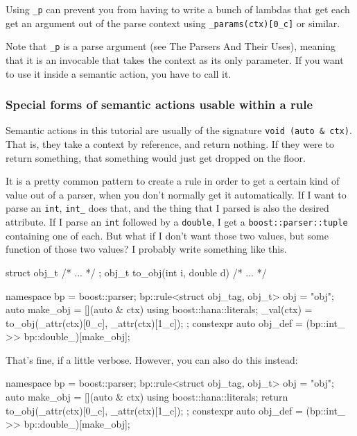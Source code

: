 Using \texttt{\_p} can prevent you from having to write a bunch of lambdas that get each get an argument out of the parse context using \texttt{\_params(ctx){[}0\_c{]}} or similar.

Note that \texttt{\_p} is a parse argument (see The Parsers And Their Uses), meaning that it is an invocable that takes the context as its only parameter. If you want to use it inside a semantic action, you have to call it.

\subsubsection{Special forms of semantic actions usable within a rule}

Semantic actions in this tutorial are usually of the signature \texttt{void (auto \& ctx)}. That is, they take a context by reference, and return nothing. If they were to return something, that something would just get dropped on the floor.

It is a pretty common pattern to create a rule in order to get a certain kind of value out of a parser, when you don't normally get it automatically. If I want to parse an \texttt{int}, \texttt{int\_} does that, and the thing that I parsed is also the desired attribute. If I parse an \texttt{int} followed by a \texttt{double}, I get a \texttt{boost::parser::tuple} containing one of each. But what if I don't want those two values, but some function of those two values? I probably write something like this.

\begin{code}
struct obj_t { /* ... */ };
obj_t to_obj(int i, double d) { /* ... */ }

namespace bp = boost::parser;
bp::rule<struct obj_tag, obj_t> obj = "obj";
auto make_obj = [](auto & ctx) {
    using boost::hana::literals;
    _val(ctx) = to_obj(_attr(ctx)[0_c], _attr(ctx)[1_c]);
};
constexpr auto obj_def = (bp::int_ >> bp::double_)[make_obj];
\end{code}

That's fine, if a little verbose. However, you can also do this instead:

\begin{code}
namespace bp = boost::parser;
bp::rule<struct obj_tag, obj_t> obj = "obj";
auto make_obj = [](auto & ctx) {
    using boost::hana::literals;
    return to_obj(_attr(ctx)[0_c], _attr(ctx)[1_c]);
};
constexpr auto obj_def = (bp::int_ >> bp::double_)[make_obj];
\end{code}

